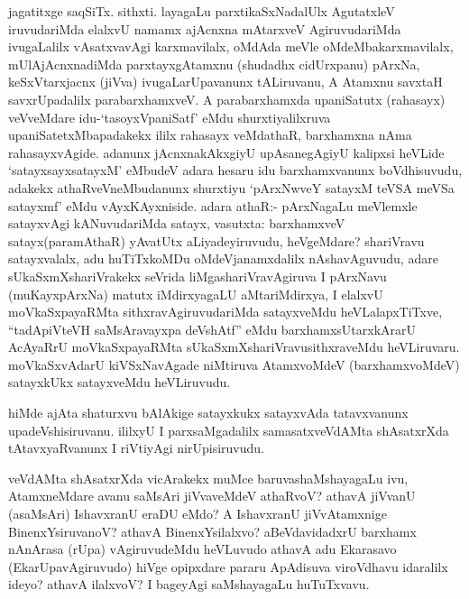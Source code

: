 

\begin{artha}
jagatitxge saqSiTx. sithxti. layagaLu parxtikaSxNadalUlx AgutatxleV
iruvudariMda elalxvU namamx ajAcnxna mAtarxveV AgiruvudariMda
ivugaLalilx vAsatxvavAgi karxmavilalx, oMdAda meVle
oMdeMbakarxmavilalx, mUlAjAcnxnadiMda parxtayxgAtamxnu (shudadhx
cidUrxpanu) pArxNa, keSxVtarxjacnx (jiVva) ivugaLarUpavanunx
tALiruvanu, A Atamxnu savxtaH savxrUpadalilx parabarxhamxveV. A
parabarxhamxda upaniSatutx (rahasayx) veVveMdare idu-`tasoyxVpaniSatf'
eMdu shurxtiyalilxruva upaniSatetxMbapadakekx ililx rahasayx veMdathaR,
barxhamxna nAma rahasayxvAgide. adanunx jAcnxnakAkxgiyU upAsanegAgiyU
kalipxsi heVLide `satayxsayxsatayxM' eMbudeV adara hesaru  idu
barxhamxvanunx boVdhisuvudu, adakekx athaRveVneMbudanunx shurxtiyu
`pArxNwveY satayxM teVSA meVSa satayxmf' eMdu
vAyxKAyxniside. adara athaR:- pArxNagaLu meVlemxle satayxvAgi
kANuvudariMda satayx, vasutxta: barxhamxveV satayx(paramAthaR)
yAvatUtx aLiyadeyiruvudu, heVgeMdare? shariVravu satayxvalalx, adu
huTiTxkoMDu oMdeVjanamxdalilx nAshavAguvudu, adare
sUkaSxmXshariVrakekx seVrida liMgashariVravAgiruva I pArxNavu
(muKayxpArxNa) matutx iMdirxyagaLU aMtariMdirxya, I elalxvU
moVkaSxpayaRMta sithxravAgiruvudariMda satayxveMdu heVLalapxTiTxve,
``tadApiVteVH saMsAravayxpa deVshAtf'' eMdu
barxhamxsUtarxkArarU  AcAyaRrU moVkaSxpayaRMta
sUkaSxmXshariVravusithxraveMdu heVLiruvaru. moVkaSxvAdarU kiVSxNavAgade
niMtiruva AtamxvoMdeV (barxhamxvoMdeV) satayxkUkx satayxveMdu
heVLiruvudu.  
\end{artha}

\begin{artha}
hiMde ajAta shaturxvu bAlAkige satayxkukx satayxvAda tatavxvanunx
upadeVshisiruvanu. ililxyU I parxsaMgadalilx samasatxveVdAMta
shAsatxrXda tAtavxyaRvanunx I riVtiyAgi nirUpisiruvudu.
\end{artha}



\begin{artha}
veVdAMta shAsatxrXda vicArakekx muMce baruvashaMshayagaLu ivu,
AtamxneMdare avanu saMsAri jiVvaveMdeV athaRvoV? athavA
jiVvanU (asaMsAri) IshavxranU eraDU eMdo? A IshavxranU jiVvAtamxnige
BinenxYsiruvanoV? athavA BinenxYsilalxvo? aBeVdavidadxrU barxhamx
nAnArasa (rUpa) vAgiruvudeMdu heVLuvudo athavA adu
Ekarasavo (EkarUpavAgiruvudo) hiVge opipxdare pararu ApAdisuva
viroVdhavu idaralilx ideyo? athavA ilalxvoV? I bageyAgi saMshayagaLu huTuTxvavu.
\end{artha}

